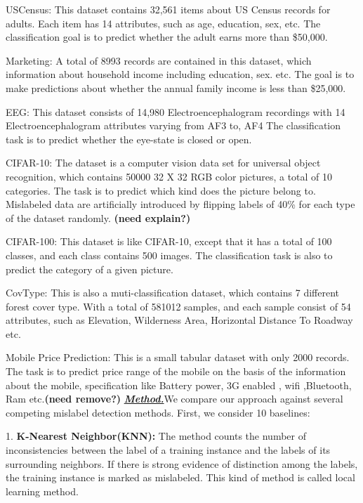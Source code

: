 \be
\item USCensus: This dataset contains 32,561 items about US Census records for adults. Each item has 14 attributes, such as age, education, sex, etc. The classification goal is to predict whether the adult earns more than \$50,000.
\item Marketing: A total of 8993 records are contained in this dataset, which information about household income including education, sex. etc. The goal is to make predictions about whether the annual family income is less than \$25,000. 
\item EEG: This dataset consists of 14,980 Electroencephalogram recordings with 14 Electroencephalogram attributes varying from AF3 to, AF4 The classification task is to predict whether the eye-state is closed or open. 
\item CIFAR-10: The dataset is a computer vision data set for universal object recognition, which contains 50000 32 X 32 RGB color pictures, a total of 10 categories. The task is to predict which kind does the picture belong to. Mislabeled data are artificially introduced by flipping labels of 40\% for each type of the dataset randomly. \textbf{(need explain?)}
\item CIFAR-100: This dataset is like CIFAR-10, except that it has a total of 100 classes, and each class contains 500 images. The classification task is also to predict the category of a given picture.
\item CovType: This is also a muti-classification dataset, which contains 7 different forest cover type. With a total of 581012 samples, and each sample consist of 54 attributes, such as Elevation, Wilderness Area, Horizontal Distance To Roadway etc.
\item Mobile Price Prediction: This is a small tabular dataset with only 2000 records. The task is to predict price range of the mobile on the basis of the information about the mobile, specification like Battery power, 3G enabled , wifi ,Bluetooth, Ram etc.\textbf{(need remove?)}
\ee
\textbf{\textit{\underline{Method.}}}We compare our approach against several competing mislabel detection methods. First, we consider 10 baselines:

1. \textbf{K-Nearest Neighbor(KNN):} The method counts the number of inconsistencies between the label of a training instance and the labels of its surrounding neighbors. If there is strong evidence of distinction among the labels, the training instance is marked as mislabeled. This kind of method is called local learning method.


